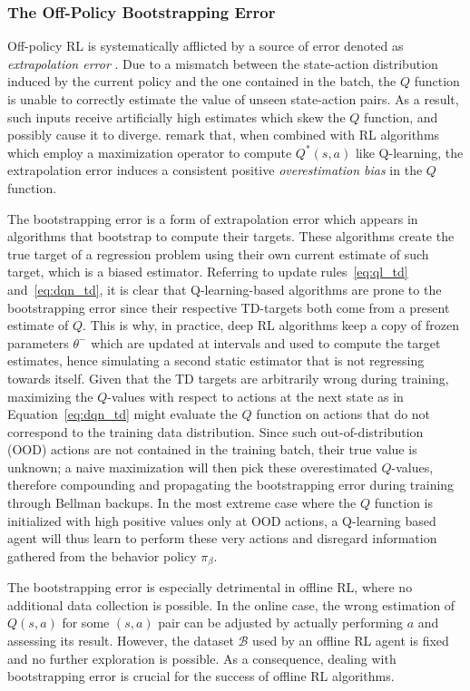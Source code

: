 \subsubsection{The Off-Policy Bootstrapping Error}\label{sec:BE}
Off-policy RL is systematically afflicted by a source of error denoted
as \textit{extrapolation error} \citep{pmlr-v97-fujimoto19a}. Due to a
mismatch between the state-action distribution induced by the current
policy and the one contained in the batch, the $Q$ function is unable
to correctly estimate the value of unseen state-action pairs. As a
result, such inputs receive artificially high estimates which
skew the $Q$ function, and possibly cause it to
diverge. \citet{pmlr-v97-fujimoto19a} remark that, when combined with
RL algorithms which employ a maximization operator to compute
$Q^*\left(s,a\right)$ like Q-learning, the extrapolation error
induces a consistent positive \textit{overestimation bias}
\citep{thrun1993issues} in the $Q$ function.

The bootstrapping error \citep{kumar2019stabilizing} is a form of
extrapolation error which appears in algorithms that bootstrap to
compute their targets. These algorithms create the true target of a
regression problem using their own current estimate of such target,
which is a biased estimator. Referring to update rules~\ref{eq:ql_td}
and~\ref{eq:dqn_td}, it is clear that Q-learning-based algorithms are
prone to the bootstrapping error since their respective TD-targets
both come from a present estimate of $Q$. This is why, in practice,
deep RL algorithms keep a copy of frozen parameters $\theta^-$ which are
updated at intervals and used to compute the target estimates,
hence simulating a second static estimator that is not regressing
towards itself.
Given that the TD targets are
arbitrarily wrong during training, maximizing the $Q$-values with
respect to actions at the next state as in Equation~\ref{eq:dqn_td}
might
evaluate the $Q$ function on actions that do not correspond to the
training data distribution. Since such out-of-distribution (OOD)
actions \citep{kumar2019stabilizing} are not contained in the training
batch, their true value is unknown; a naive maximization will then
pick these overestimated $Q$-values, therefore compounding and
propagating the bootstrapping error during training through Bellman
backups. In the most extreme case where the $Q$ function is
initialized with high positive values only at OOD actions, a
Q-learning based agent will thus learn to perform these very actions
and disregard information gathered from the behavior policy
$\pi_\beta$.

The bootstrapping error is especially detrimental in offline RL, where
no additional data collection is possible. In the online case, the
wrong estimation of $Q\left(s,a\right)$ for some $\left(s,a\right)$
pair can be adjusted by actually performing $a$ and assessing its
result. However, the dataset $\mathcal{B}$ used by an offline RL agent
is fixed and no further exploration is possible. As a consequence,
dealing with bootstrapping error is crucial for the success of offline
RL algorithms.
